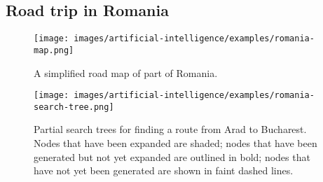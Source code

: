 \subsection{Road trip in Romania \cite{ai/book/Artificial-Intelligence-A-Modern-Approach/Russell-Norvig}}


\begin{figure}[H]
    \centering
    \texttt{[image: images/artificial-intelligence/examples/romania-map.png]}
    \caption*{A simplified road map of part of Romania. \cite{ai/book/Artificial-Intelligence-A-Modern-Approach/Russell-Norvig}}
\end{figure}


\begin{figure}[H]
    \centering
    \texttt{[image: images/artificial-intelligence/examples/romania-search-tree.png]}
    \caption*{Partial search trees for finding a route from Arad to Bucharest. Nodes that have been expanded are shaded; nodes that have been generated but not yet expanded are outlined in bold; nodes that have not yet been generated are shown in faint dashed lines. \cite{ai/book/Artificial-Intelligence-A-Modern-Approach/Russell-Norvig}}
\end{figure}





